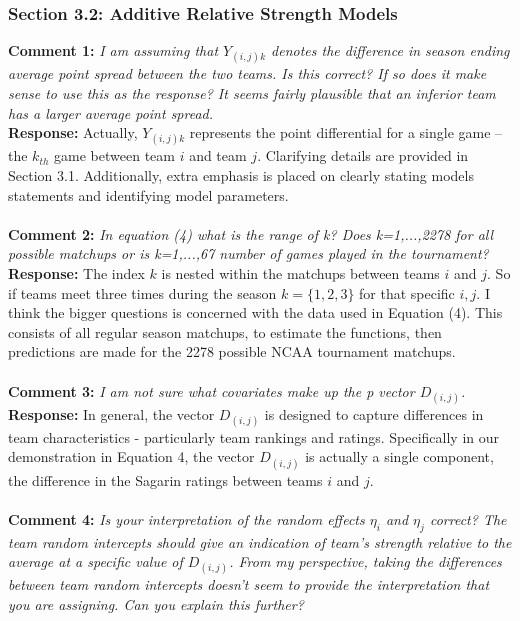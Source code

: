 \documentclass[11pt]{article} %
\begin{document}
\subsubsection*{Section 3.2: Additive Relative Strength Models}
{\bf Comment 1:} \emph{I am assuming that $Y_{(i,j)k}$ denotes the difference in season ending average point spread between the two teams. Is this correct? If so does it make sense to use this as the response? It seems fairly plausible that an inferior team has a larger average point spread.\\}
{\bf Response:} Actually, $Y_{(i,j)k}$ represents the point differential for a single game -- the $k_{th}$ game between team $i$ and team $j$. Clarifying details are provided in Section 3.1. Additionally, extra emphasis is placed on clearly stating models statements and identifying model parameters.\\
\\
{\bf Comment 2:} \emph{In equation (4) what is the range of k? Does k=1,...,2278 for all possible matchups or is k=1,...,67 number of games played in the tournament?\\}
{\bf Response:} The index $k$ is nested within the matchups between teams $i$ and $j$. So if teams meet three times during the season $k = \{1,2,3\}$ for that specific $i,j$. I think the bigger questions is concerned with the data used in Equation (4). This consists of all regular season matchups, to estimate the functions, then predictions are made for the 2278 possible NCAA tournament matchups.\\
\\
{\bf Comment 3:} \emph{I am not sure what covariates make up the p vector $D_{(i,j)}$.\\}
{\bf Response:} In general, the vector $D_{(i,j)}$ is designed to capture differences in team characteristics - particularly team rankings and ratings. Specifically in our demonstration in Equation 4, the vector $D_{(i,j)}$ is actually a  single component, the difference in the Sagarin ratings between teams $i$ and $j$.  \\
\\
{\bf Comment 4:} \emph{Is your interpretation of the random effects $\eta_i$ and $\eta_j$ correct? The team random intercepts should give an indication of team's strength relative to the average at a specific value of $D_{(i,j)}$. From my perspective, taking the differences between team random intercepts doesn't seem to provide the interpretation that you are assigning. Can you explain this further?\\}
\end{document}
